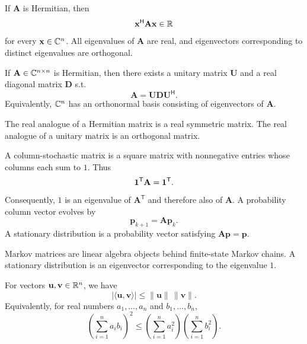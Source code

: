     \begin{proposition}
        If $\mathbf{A}$ is Hermitian, then
        \[
            \mathbf{x}^{\mathsf H}\mathbf{A}\mathbf{x}\in\mathbb{R}
        \]
        for every $\mathbf{x}\in\mathbb{C}^n$. All eigenvalues of $\mathbf{A}$ are real,
        and eigenvectors corresponding to distinct eigenvalues are orthogonal.
    \end{proposition}

    \begin{theorem}
        If $\mathbf{A}\in\mathbb{C}^{n\times n}$ is Hermitian, then there exists a
        unitary matrix $\mathbf{U}$ and a real diagonal matrix $\mathbf{D}$ s.t.
        \[
            \mathbf{A}
            =
            \mathbf{U}\mathbf{D}\mathbf{U}^{\mathsf H}.
        \]
        Equivalently, $\mathbb{C}^n$ has an orthonormal basis consisting of eigenvectors
        of $\mathbf{A}$.
    \end{theorem}

    \begin{remark}
        The real analogue of a Hermitian matrix is a real symmetric matrix.
        The real analogue of a unitary matrix is an orthogonal matrix.
    \end{remark}

    \begin{definition}
        A column-stochastic matrix is a square matrix with nonnegative entries
        whose columns each sum to $1$. Thus
        \[
            \mathbf{1}^{\mathsf T}\mathbf{A}=\mathbf{1}^{\mathsf T}.
        \]
        Consequently, $1$ is an eigenvalue of $\mathbf{A}^{\mathsf T}$ and
        therefore also of $\mathbf{A}$. A probability column vector evolves by
        \[
            \mathbf{p}_{k+1}=\mathbf{A}\mathbf{p}_k.
        \]
        A stationary distribution is a probability vector satisfying
        $\mathbf{A}\mathbf{p}=\mathbf{p}$.
    \end{definition}

    \begin{remark}
        Markov matrices are linear algebra objects behind finite-state Markov
        chains. A stationary distribution is an eigenvector corresponding to the
        eigenvalue $1$.
    \end{remark}

    \begin{theorem}
        For vectors $\mathbf{u},\mathbf{v}\in\mathbb{R}^n$, we have
        \[
            |\langle\mathbf{u},\mathbf{v}\rangle|
            \leq
            \|\mathbf{u}\|\,\|\mathbf{v}\|.
        \]
        Equivalently, for real numbers $a_1,\dots,a_n$ and
        $b_1,\dots,b_n$,
        \[
            \left(\sum_{i=1}^{n}a_i b_i\right)^2
            \leq
            \left(\sum_{i=1}^{n}a_i^2\right)
            \left(\sum_{i=1}^{n}b_i^2\right).
        \]
    \end{theorem}

